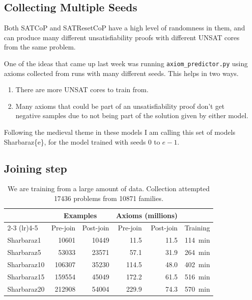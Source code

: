 \documentclass[10pt,a4paper,twocolumn]{article}
\newcommand{\cop}[1]{\textsf{#1}}
\begin{document}
\subsection{Collecting Multiple Seeds}

Both \cop{SATCoP} and \cop{SATResetCoP} have a high level of randomness in them, and can produce many different unsatisfiability proofs with different UNSAT cores from the same problem.

One of the ideas that came up last week was running \texttt{axiom\_predictor.py} using axioms collected from runs with many different seeds.
This helps in two ways.
\begin{enumerate}
	\item There are more UNSAT cores to train from.
	\item Many axioms that could be part of an unsatisfiability proof don't get negative samples due to not being part of the solution given by either model.
\end{enumerate}

Following the medieval theme in these models I am calling this set of models \cop{Sharbaraz\{e\}}, for the model trained with seeds $0$ to $e - 1$.

\subsection{Joining step}

\begin{table}[h]
	\centering
	\scriptsize
	\setlength{\tabcolsep}{4pt}
	\begin{tabular}{lrrrrr}
		\toprule
		& \multicolumn{2}{c}{Examples} & \multicolumn{2}{c}{Axioms (millions)} & \\
		\cmidrule(lr){2-3} \cmidrule(lr){4-5}
		& Pre-join & Post-join & Pre-join & Post-join & Training \\
		\midrule
		\cop{Sharbaraz1} & \num{10601} & \num{10449} & \num{11.5} & \num{11.5} & \qty{114}{\minute} \\
		\cop{Sharbaraz5} & \num{53033} & \num{23571} & \num{57.1} & \num{31.9} & \qty{264}{\minute} \\
		\cop{Sharbaraz10} & \num{106307} & \num{35230} & \num{114.5} & \num{48.0} & \qty{402}{\minute} \\
		\cop{Sharbaraz15} & \num{159554} & \num{45049} & \num{172.2} & \num{61.5} & \qty{516}{\minute} \\
		\cop{Sharbaraz20} & \num{212908} & \num{54004} & \num{229.9} & \num{74.3} & \qty{570}{\minute} \\
		\bottomrule
	\end{tabular}
	\caption{We are training from a large amount of data. Collection attempted \num{17436} problems from \num{10871} families.}
	\label{join_table}
\end{table}
\end{document}
